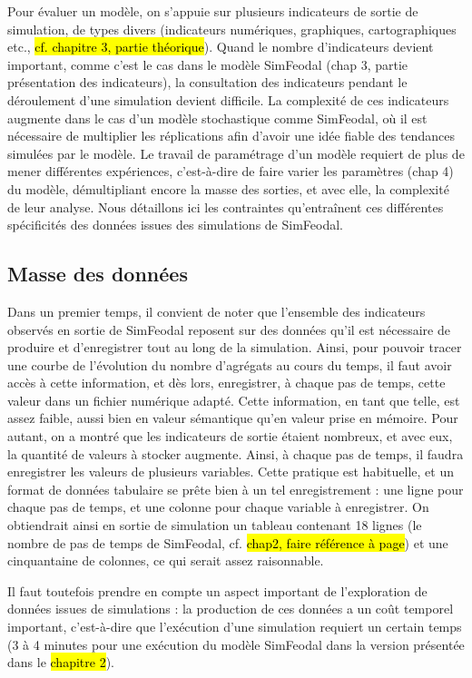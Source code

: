 Pour évaluer un modèle, on s'appuie sur plusieurs indicateurs de sortie de simulation, de types divers (indicateurs numériques, graphiques, cartographiques etc., \hl{cf. chapitre 3, partie théorique}).
Quand le nombre d'indicateurs devient important, comme c'est le cas dans le modèle SimFeodal (chap 3, partie présentation des indicateurs), la consultation des indicateurs pendant le déroulement d'une simulation devient difficile.
La complexité de ces indicateurs augmente dans le cas d'un modèle stochastique comme SimFeodal, où il est nécessaire de multiplier les réplications afin d'avoir une idée fiable des tendances simulées par le modèle.
Le travail de paramétrage d'un modèle requiert de plus de mener différentes expériences, c'est-à-dire de faire varier les paramètres (chap 4) du modèle, démultipliant encore la masse des sorties, et avec elle, la complexité de leur analyse.
Nous détaillons ici les contraintes qu'entraînent ces différentes spécificités des données issues des simulations de SimFeodal.

	\subsection{Masse des données}
	Dans un premier temps, il convient de noter que l'ensemble des indicateurs observés en sortie de SimFeodal reposent sur des données qu'il est nécessaire de produire et d'enregistrer tout au long de la simulation.
	Ainsi, pour pouvoir tracer une courbe de l'évolution du nombre d'agrégats au cours du temps, il faut avoir accès à cette information, et dès lors, enregistrer, à chaque pas de temps, cette valeur dans un fichier numérique adapté.
	Cette information, en tant que telle, est assez faible, aussi bien en valeur sémantique qu'en valeur prise en mémoire.
	Pour autant, on a montré que les indicateurs de sortie étaient nombreux, et avec eux, la quantité de valeurs à stocker augmente.
	Ainsi, à chaque pas de temps, il faudra enregistrer les valeurs de plusieurs variables.
	Cette pratique est habituelle, et un format de données tabulaire se prête bien à un tel enregistrement : une ligne pour chaque pas de temps, et une colonne pour chaque variable à enregistrer.
	On obtiendrait ainsi en sortie de simulation un tableau contenant 18 lignes (le nombre de pas de temps de SimFeodal, cf. \hl{chap2, faire référence à page}) et une cinquantaine de colonnes, ce qui serait assez raisonnable.

	Il faut toutefois prendre en compte un aspect important de l'exploration de données issues de simulations : la production de ces données a un coût temporel important, c'est-à-dire que l'exécution d'une simulation requiert un certain temps (3 à 4 minutes pour une exécution du modèle SimFeodal dans la version présentée dans le \hl{chapitre 2}).
	
